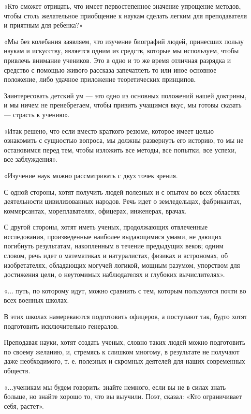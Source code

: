 \documentclass[12pt, a4paper, openany]{book}
\begin{document}
«Кто сможет отрицать, что имеет первостепенное  значение упрощение методов, чтобы столь желательное  приобщение к наукам сделать легким для преподавателя и  приятным для ребенка?» 

«Мы без колебания заявляем, что изучение биографий людей, принесших пользу наукам и искусству, является одним из средств, которые мы используем, чтобы привлечь внимание учеников. Это в одно и то же время отличная разрядка и средство с помощью живого рассказа  запечатлеть то или иное основное положение, либо удачное  приложение теоретических принципов. 

Заинтересовать детский ум — это одно из основных  положений нашей доктрины, и мы ничем не пренебрегаем, чтобы привить учащимся вкус, мы готовы сказать — страсть к учению». 

«Итак решено, что если вместо краткого резюме, которое имеет целью ознакомить с сущностью вопроса, мы должны развернуть его историю, то мы не остановимся перед тем, чтобы изложить все методы, все попытки, все успехи, все заблуждения». 

«Изучение наук можно рассматривать с двух точек зрения. 

С одной стороны, хотят получить людей полезных и с опытом во всех областях деятельности цивилизованных народов. Речь идет о земледельцах, фабрикантах,  коммерсантах, мореплавателях, офицерах, инженерах, врачах. 

С другой стороны, хотят иметь ученых, продолжающих отвлеченные исследования, произведенные наиболее  выдающимися умами, не дающих погибнуть результатам,  накопленным в течение предыдущих веков; одним словом, речь идет о математиках и натуралистах, физиках и  астрономах, об изобретателях, обладающих могучей логикой, мощным разумом, упорством для достижения цели, о  неутомимых наблюдателях и глубоких вычислителях». 

«... путь, по которому идут, можно сравнить с тем, которым пользуются почти во всех военных школах. 

В этих школах намереваются подготовить офицеров, а поступают так, будто хотят подготовить исключительно генералов. 

Преподавая науки, хотят создать ученых, словно таких людей можно подготовить по своему желанию, и, стремясь к слишком многому, в результате не получают даже  необходимого, т. е. полезных и скромных деятелей для наших современных обществ. 

«...ученикам мы будем говорить: знайте немного, если вы не в силах знать больше, но знайте хорошо то, что вы выучили. Поэт, сказал: «Кто ограничивает себя, растет». 
\end{document}
